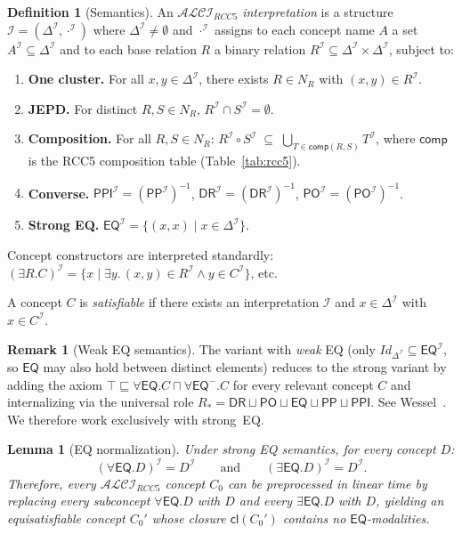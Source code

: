 \documentclass[a4paper,11pt]{article}
\newtheorem{lemma}[theorem]{Lemma}
\theoremstyle{definition}
\newtheorem{definition}[theorem]{Definition}
\newtheorem{remark}[theorem]{Remark}
\newcommand{\ALCIRCC}[1]{\ensuremath{\mathcal{ALCI}_{\mathit{RCC#1}}}}
\newcommand{\NR}{\ensuremath{N_R}}
\newcommand{\DeltaI}{\ensuremath{\Delta^{\mathcal{I}}}}
\newcommand{\interp}{\ensuremath{\mathcal{I}}}
\newcommand{\DR}{\ensuremath{\mathsf{DR}}}
\newcommand{\PO}{\ensuremath{\mathsf{PO}}}
\newcommand{\EQ}{\ensuremath{\mathsf{EQ}}}
\newcommand{\PP}{\ensuremath{\mathsf{PP}}}
\newcommand{\PPI}{\ensuremath{\mathsf{PPI}}}
\newcommand{\comp}{\ensuremath{\mathsf{comp}}}
\newcommand{\cl}{\ensuremath{\mathsf{cl}}}
\begin{document}
\begin{definition}[Semantics]
\label{def:semantics}
An \emph{$\ALCIRCC{5}$ interpretation} is a structure $\interp =
(\DeltaI, \cdot^{\interp})$ where $\DeltaI \neq \emptyset$ and
$\cdot^{\interp}$ assigns to each concept name $A$ a set $A^{\interp}
\subseteq \DeltaI$ and to each base relation $R$ a binary relation
$R^{\interp} \subseteq \DeltaI \times \DeltaI$, subject to:
\begin{enumerate}[label=(S\arabic*),nosep]
  \item \label{ax:cluster} \textbf{One cluster.} For all $x,y \in
    \DeltaI$, there exists $R \in \NR$ with $(x,y) \in R^{\interp}$.
  \item \label{ax:jepd} \textbf{JEPD.} For distinct $R,S \in \NR$,
    $R^{\interp} \cap S^{\interp} = \emptyset$.
  \item \label{ax:comp} \textbf{Composition.} For all $R,S \in \NR$:
    $R^{\interp} \circ S^{\interp} \;\subseteq\;
    \bigcup_{T \in \comp(R,S)} T^{\interp}$,
    where $\comp$ is the RCC5 composition table (Table~\ref{tab:rcc5}).
  \item \label{ax:conv} \textbf{Converse.} $\PPI^{\interp} =
    (\PP^{\interp})^{-1}$, $\DR^{\interp} = (\DR^{\interp})^{-1}$,
    $\PO^{\interp} = (\PO^{\interp})^{-1}$.
  \item \label{ax:eq} \textbf{Strong EQ.} $\EQ^{\interp} =
    \{(x,x) \mid x \in \DeltaI\}$.
\end{enumerate}
Concept constructors are interpreted standardly:
$(\exists R.C)^{\interp} = \{x \mid \exists y.\, (x,y) \in
R^{\interp} \land y \in C^{\interp}\}$, etc.

A concept $C$ is \emph{satisfiable} if there exists an interpretation
$\interp$ and $x \in \DeltaI$ with $x \in C^{\interp}$.
\end{definition}

\begin{remark}[Weak EQ semantics]
The variant with \emph{weak} EQ (only $\mathit{Id}_{\DeltaI} \subseteq
\EQ^{\interp}$, so $\EQ$ may also hold between distinct elements)
reduces to the strong variant by adding the axiom $\top \sqsubseteq
\forall \EQ.C \sqcap \forall \EQ^{-}.C$ for every relevant concept
$C$ and internalizing via the universal role $R_* = \DR \sqcup \PO
\sqcup \EQ \sqcup \PP \sqcup \PPI$.  See Wessel~\cite[Section
4.3]{Wessel2003}.  We therefore work exclusively with strong~EQ.
\end{remark}

\begin{lemma}[EQ normalization]
\label{lem:eq-norm}
Under strong EQ semantics, for every concept $D$:
\[
  (\forall \EQ.D)^{\interp} = D^{\interp} \qquad\text{and}\qquad
  (\exists \EQ.D)^{\interp} = D^{\interp}.
\]
Therefore, every $\ALCIRCC{5}$ concept $C_0$ can be preprocessed in
linear time by replacing every subconcept $\forall \EQ.D$ with $D$ and
every $\exists \EQ.D$ with $D$, yielding an equisatisfiable concept
$C_0'$ whose closure $\cl(C_0')$ contains no $\EQ$-modalities.
\end{lemma}
\end{document}

